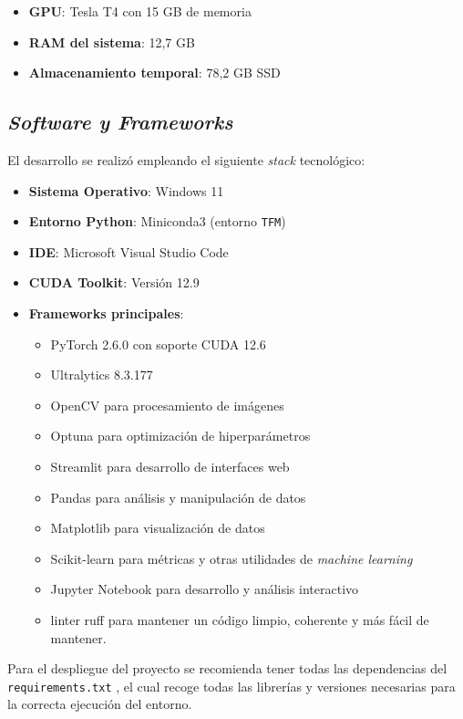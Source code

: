 \documentclass[12pt,a4paper,onecolumn,oneside]{report}
\begin{document}
\begin{itemize}
    \item \textbf{GPU}: Tesla T4 con 15 GB de memoria
    \item \textbf{RAM del sistema}: 12,7 GB
    \item \textbf{Almacenamiento temporal}: 78,2 GB SSD
\end{itemize}

\subsection{\textit{Software y Frameworks}}

El desarrollo se realizó empleando el siguiente \textit{stack} tecnológico:

\begin{itemize}
    \item \textbf{Sistema Operativo}: Windows 11
    \item \textbf{Entorno Python}: Miniconda3 (entorno \texttt{TFM})
    \item \textbf{IDE}: Microsoft Visual Studio Code
    \item \textbf{CUDA Toolkit}: Versión 12.9
    \item \textbf{Frameworks principales}:
    \begin{itemize}
        \item PyTorch 2.6.0 con soporte CUDA 12.6
        \item Ultralytics 8.3.177
        \item OpenCV para procesamiento de imágenes
        \item Optuna para optimización de hiperparámetros 
        \item Streamlit para desarrollo de interfaces web
        \item Pandas para análisis y manipulación de datos
        \item Matplotlib para visualización de datos 
        \item Scikit-learn para métricas y otras utilidades de \textit{machine learning}
        \item Jupyter Notebook para desarrollo y análisis interactivo
        \item linter ruff para mantener un código limpio, coherente y más fácil de mantener.
    \end{itemize}
\end{itemize}

Para el despliegue del proyecto se recomienda tener todas las dependencias del \texttt{requirements.txt} \cite{repoTFM}, el cual 
recoge todas las librerías y versiones necesarias para la correcta ejecución del entorno.
\end{document}

